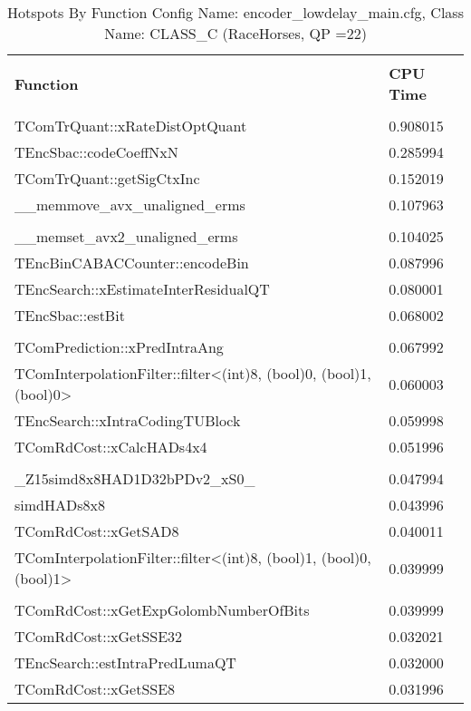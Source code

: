 \documentclass{article}%
\begin{document}
\begin{longtabu}{| X[l] | X[l] |}%
\caption{%
Hotspots By Function\newline%
 Config Name: encoder\_lowdelay\_main.cfg,\newline%
 Class Name: CLASS\_C\newline%
 (RaceHorses, QP =22)%
}%
\hline%
&\\%
\textbf{Function}&\textbf{CPU Time}\\%
&\\%
\hline%
\endhead%
TComTrQuant::xRateDistOptQuant&0.908015\\%
\hline%
TEncSbac::codeCoeffNxN&0.285994\\%
\hline%
TComTrQuant::getSigCtxInc&0.152019\\%
\hline%
\_\_memmove\_avx\_unaligned\_erms&0.107963\\%
\hline%
&\\%
\hline%
\_\_memset\_avx2\_unaligned\_erms&0.104025\\%
\hline%
TEncBinCABACCounter::encodeBin&0.087996\\%
\hline%
TEncSearch::xEstimateInterResidualQT&0.080001\\%
\hline%
TEncSbac::estBit&0.068002\\%
\hline%
&\\%
\hline%
TComPrediction::xPredIntraAng&0.067992\\%
\hline%
TComInterpolationFilter::filter<(int)8, (bool)0, (bool)1, (bool)0>&0.060003\\%
\hline%
TEncSearch::xIntraCodingTUBlock&0.059998\\%
\hline%
TComRdCost::xCalcHADs4x4&0.051996\\%
\hline%
&\\%
\hline%
\_Z15simd8x8HAD1D32bPDv2\_xS0\_&0.047994\\%
\hline%
simdHADs8x8&0.043996\\%
\hline%
TComRdCost::xGetSAD8&0.040011\\%
\hline%
TComInterpolationFilter::filter<(int)8, (bool)1, (bool)0, (bool)1>&0.039999\\%
\hline%
&\\%
\hline%
TComRdCost::xGetExpGolombNumberOfBits&0.039999\\%
\hline%
TComRdCost::xGetSSE32&0.032021\\%
\hline%
TEncSearch::estIntraPredLumaQT&0.032000\\%
\hline%
TComRdCost::xGetSSE8&0.031996\\%
\hline%
\end{longtabu}%
\end{document}
